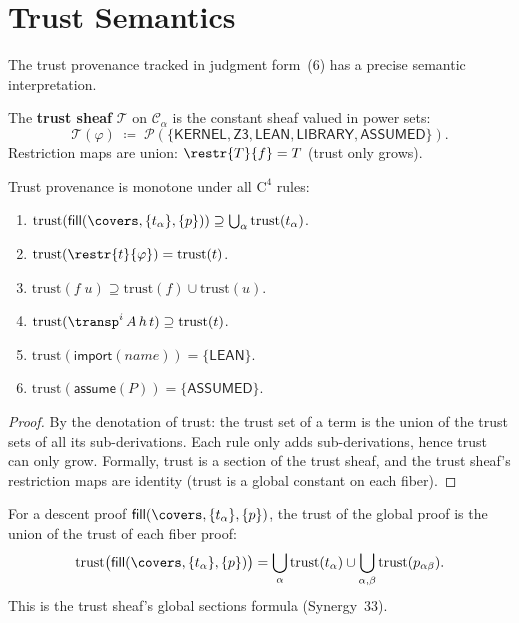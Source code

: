 \section{Trust Semantics}
\label{sec:trust-semantics}

The trust provenance tracked in judgment form~(6) has a precise
semantic interpretation.

\begin{definition}
The \textbf{trust sheaf} \(\mathcal{T}\) on \(\mathcal{C}_\alpha\) is the
constant sheaf valued in power sets:
\[
  \mathcal{T}(\varphi) \;\coloneqq\;
  \mathcal{P}(\{\mathsf{KERNEL}, \mathsf{Z3}, \mathsf{LEAN},
  \mathsf{LIBRARY}, \mathsf{ASSUMED}\}).
\]
Restriction maps are union: \(\restr{T}{f} = T\) (trust only grows).
\end{definition}

\begin{theorem}
\label{thm:trust-mono}
Trust provenance is monotone under all \(\mathrm{C}^4\) rules:
\begin{enumerate}
\item \(\mathrm{trust}(\mathsf{fill}(\covers, \{t_\alpha\}, \{p\})) \supseteq
  \bigcup_\alpha \mathrm{trust}(t_\alpha)\).
\item \(\mathrm{trust}(\restr{t}{\varphi}) = \mathrm{trust}(t)\).
\item \(\mathrm{trust}(f\; u) \supseteq \mathrm{trust}(f) \cup \mathrm{trust}(u)\).
\item \(\mathrm{trust}(\transp^i\, A\, h\, t) \supseteq \mathrm{trust}(t)\).
\item \(\mathrm{trust}(\mathsf{import}(\mathit{name})) = \{\mathsf{LEAN}\}\).
\item \(\mathrm{trust}(\mathsf{assume}(P)) = \{\mathsf{ASSUMED}\}\).
\end{enumerate}
\end{theorem}

\begin{proof}
By the denotation of trust: the trust set of a term is the union of
the trust sets of all its sub-derivations.  Each rule only adds
sub-derivations, hence trust can only grow.  Formally, trust is
a section of the trust sheaf, and the trust sheaf's restriction maps
are identity (trust is a global constant on each fiber).
\end{proof}

\begin{corollary}
For a descent proof \(\mathsf{fill}(\covers, \{t_\alpha\}, \{p\})\),
the trust of the global proof is the union of the trust of each
fiber proof:
\[
  \mathrm{trust}\bigl(\mathsf{fill}(\covers, \{t_\alpha\}, \{p\})\bigr)
  = \bigcup_\alpha \mathrm{trust}(t_\alpha)
  \cup \bigcup_{\alpha,\beta} \mathrm{trust}(p_{\alpha\beta}).
\]
This is the trust sheaf's global sections formula (Synergy~33).
\end{corollary}


